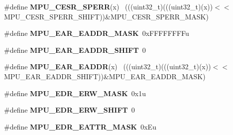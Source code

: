 \begin{DoxyCompactItemize}
\item 
\hypertarget{group___m_p_u___register___masks_ga75132936153b01c17b2909bc8a61c395}{}\#define {\bfseries M\+P\+U\+\_\+\+C\+E\+S\+R\+\_\+\+S\+P\+E\+R\+R}(x)                                            ~(((uint32\+\_\+t)(((uint32\+\_\+t)(x))$<$$<$M\+P\+U\+\_\+\+C\+E\+S\+R\+\_\+\+S\+P\+E\+R\+R\+\_\+\+S\+H\+I\+F\+T))\&M\+P\+U\+\_\+\+C\+E\+S\+R\+\_\+\+S\+P\+E\+R\+R\+\_\+\+M\+A\+S\+K)\label{group___m_p_u___register___masks_ga75132936153b01c17b2909bc8a61c395}

\item 
\hypertarget{group___m_p_u___register___masks_ga2fec46c3866c88337f8ee0639c8d81b5}{}\#define {\bfseries M\+P\+U\+\_\+\+E\+A\+R\+\_\+\+E\+A\+D\+D\+R\+\_\+\+M\+A\+S\+K}~0x\+F\+F\+F\+F\+F\+F\+F\+Fu\label{group___m_p_u___register___masks_ga2fec46c3866c88337f8ee0639c8d81b5}

\item 
\hypertarget{group___m_p_u___register___masks_ga2bbd867e08b8ad2b609ab33a558e501c}{}\#define {\bfseries M\+P\+U\+\_\+\+E\+A\+R\+\_\+\+E\+A\+D\+D\+R\+\_\+\+S\+H\+I\+F\+T}~0\label{group___m_p_u___register___masks_ga2bbd867e08b8ad2b609ab33a558e501c}

\item 
\hypertarget{group___m_p_u___register___masks_ga7815747123ac5e47bae56092e96eb1df}{}\#define {\bfseries M\+P\+U\+\_\+\+E\+A\+R\+\_\+\+E\+A\+D\+D\+R}(x)                                              ~(((uint32\+\_\+t)(((uint32\+\_\+t)(x))$<$$<$M\+P\+U\+\_\+\+E\+A\+R\+\_\+\+E\+A\+D\+D\+R\+\_\+\+S\+H\+I\+F\+T))\&M\+P\+U\+\_\+\+E\+A\+R\+\_\+\+E\+A\+D\+D\+R\+\_\+\+M\+A\+S\+K)\label{group___m_p_u___register___masks_ga7815747123ac5e47bae56092e96eb1df}

\item 
\hypertarget{group___m_p_u___register___masks_ga469d59f7f1a51f8d7041b2404a246fb6}{}\#define {\bfseries M\+P\+U\+\_\+\+E\+D\+R\+\_\+\+E\+R\+W\+\_\+\+M\+A\+S\+K}~0x1u\label{group___m_p_u___register___masks_ga469d59f7f1a51f8d7041b2404a246fb6}

\item 
\hypertarget{group___m_p_u___register___masks_ga927ea9ae9756926304a7199714ee646a}{}\#define {\bfseries M\+P\+U\+\_\+\+E\+D\+R\+\_\+\+E\+R\+W\+\_\+\+S\+H\+I\+F\+T}~0\label{group___m_p_u___register___masks_ga927ea9ae9756926304a7199714ee646a}

\item 
\hypertarget{group___m_p_u___register___masks_ga92ec1bda4da654cec287d9c1bfadd4e7}{}\#define {\bfseries M\+P\+U\+\_\+\+E\+D\+R\+\_\+\+E\+A\+T\+T\+R\+\_\+\+M\+A\+S\+K}~0x\+Eu\label{group___m_p_u___register___masks_ga92ec1bda4da654cec287d9c1bfadd4e7}


\end{DoxyCompactItemize}
